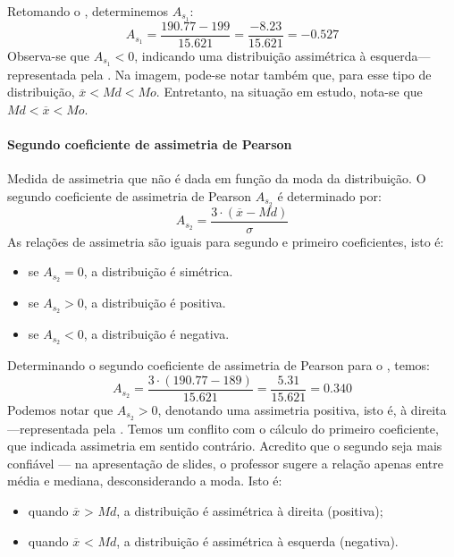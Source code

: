 Retomando o , determinemos $A_{s_1}$:
\[
    A_{s_1} = \frac{190.77 - 199}{15.621} = \frac{-8.23}{15.621} = -0.527
\]
Observa-se que $A_{s_1}<0$, indicando uma distribuição assimétrica à
esquerda---representada pela . Na imagem, pode-se notar
também que, para esse tipo de distribuição, $\overline{x}<Md<Mo$. Entretanto,
na situação em estudo, nota-se que $Md<\overline{x}<Mo$.

\paragraph{Segundo coeficiente de assimetria de Pearson}
Medida de assimetria que não é dada em função da moda da distribuição. O
segundo coeficiente de assimetria de Pearson $A_{s_2}$ é determinado por:
\begin{equation}
    A_{s_2} = \frac{3 \cdot (\overline{x} - Md)}{\sigma}
    \label{eq:seg-coef-ass-pearson}
\end{equation}
As relações de assimetria são iguais para segundo e primeiro coeficientes, isto
é:
\begin{itemize}
    \item se $A_{s_2}=0$, a distribuição é simétrica.
    \item se $A_{s_2}>0$, a distribuição é positiva.
    \item se $A_{s_2}<0$, a distribuição é negativa.
\end{itemize}
Determinando o segundo coeficiente de assimetria de Pearson para o
, temos:
\[
    A_{s_2} = \frac{3 \cdot (190.77-189)}{15.621} = \frac{5.31}{15.621} = 0.340
\]
Podemos notar que $A_{s_2}>0$, denotando uma assimetria positiva, isto é, à
direita---representada pela . Temos um conflito com o
cálculo do primeiro coeficiente, que indicada assimetria em sentido contrário.
Acredito que o segundo seja mais confiável --- na apresentação de slides, o
professor sugere a relação apenas entre média e mediana, desconsiderando a
moda. Isto é:
\begin{itemize}
    \item quando $\overline{x}$ > $Md$, a distribuição é assimétrica à direita
    (positiva);
    \item quando $\overline{x}$ < $Md$, a distribuição é assimétrica à esquerda
    (negativa).
\end{itemize}

